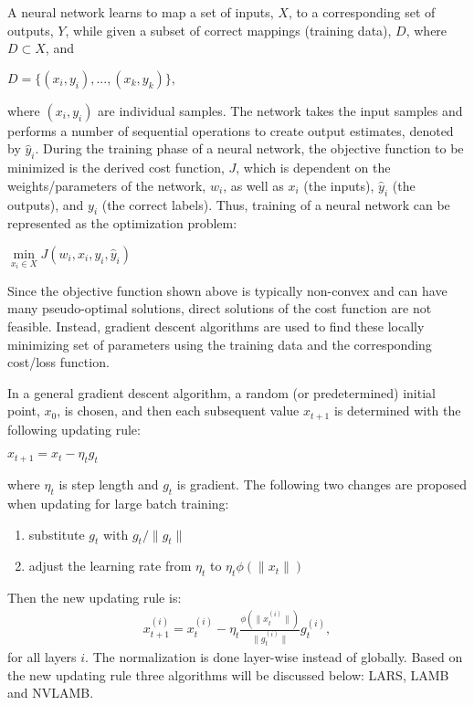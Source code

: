 A neural network learns to map a set of inputs, $X$, to a corresponding set of outputs, $Y$, while given a subset of correct mappings (training data), $D$, where $D \subset X$, and
\begin{center}
$D = \{(x_i,y_i),...,(x_k,y_k)\},$
\end{center}
where $(x_i,y_i)$ are individual samples. The network takes the input samples and performs a number of sequential operations to create output estimates, denoted by $\hat y_i$. During the training phase of a neural network, the objective function to be minimized is the derived cost function, $J$, which is dependent on the weights/parameters of the network, $w_i$, as well as $x_i$ (the inputs), $\hat y_i$ (the outputs), and $y_i$ (the correct labels). Thus, training of a neural network can be represented as the optimization problem:

\begin{center}
$\min\limits_{x_i \in X} J(w_i,x_i,y_i,\hat y_i)$
\end{center}

Since the objective function shown above is typically non-convex and can have many pseudo-optimal solutions, direct solutions of the cost function are not feasible. Instead, gradient descent algorithms are used to find these locally minimizing set of parameters using the training data and the corresponding cost/loss function.

In a general gradient descent algorithm, a random (or predetermined) initial point, $x_0$, is chosen, and then each subsequent value $x_{t+1}$ is determined with the following updating rule:
\begin{center}
$x_{t+1} = x_t - \eta_t g_t $
\end{center} 
where $\eta_t$ is step length and $g_t$ is gradient. The following two changes are proposed when updating for large batch training:
\begin{enumerate}
    \item substitute $g_t$ with $g_t/\|g_t\|$ 
    \item adjust the learning rate from $\eta_t$ to $\eta_t\phi(\|x_t\|)$
\end{enumerate}
Then the new updating rule is:
\begin{align*}
x_{t+1}^{(i)} = x_t^{(i)} - \eta_t \frac{\phi(\|x_t^{(i)}\|)}{\|g_t^{(i)}\|}g_t^{(i)}, 
\end{align*}
for all layers $i$. The normalization is done layer-wise instead of globally. 
Based on the new updating rule three algorithms will be discussed below: LARS, LAMB and NVLAMB.
